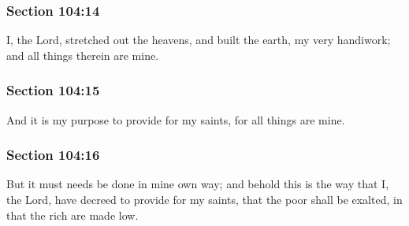 	\subsubsection{Section 104:14} %
		\label{DC104-14}

		I, the Lord, stretched out the heavens, and built the earth, my very handiwork; and all things therein are mine.


	\subsubsection{Section 104:15} %
		\label{DC104-15}

		And it is my purpose to provide for my saints, for all things are mine.


	\subsubsection{Section 104:16} %
		\label{DC104-16}

		But it must needs be done in mine own way; and behold this is the way that I, the Lord, have decreed to provide for my saints, that the poor shall be exalted, in that the rich are made low.


